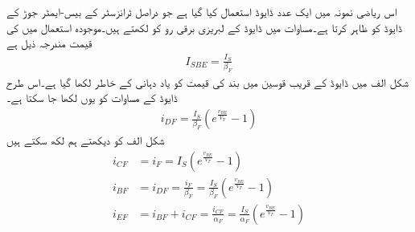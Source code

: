اس ریاضی نمونہ  میں ایک عدد ڈایوڈ استعمال کیا گیا ہے جو دراصل ٹرانزسٹر  کے بیس-ایمٹر  جوڑ کے ڈایوڈ  کو ظاہر کرتا ہے۔مساوات  میں ڈایوڈ کے لبریزی برقی رو کو  لکھتے ہیں۔موجودہ استعمال میں  کی قیمت مندرجہ ذیل ہے
\begin{align}
I_{SBE}=\frac{I_S}{\beta_F}
\end{align}
شکل  الف   میں ڈایوڈ  کے قریب قوسین میں بند   کی قیمت   کو یاد دہانی کے خاطر لکھا گیا ہے۔اس طرح ڈایوڈ   کے مساوات کو یوں لکھا جا سکتا ہے۔
\begin{align}
i_{DF}=\frac{I_S}{\beta_F} \left (e^{\frac{v_{BE}}{V_T}}-1 \right )
\end{align}
شکل  الف   کو دیکھتے ہم لکھ سکتے ہیں 
\begin{align} \label{مساوات_ٹرانزسٹر_مال_برداری_سیدھے_رو}
i_{CF}&=i_F=I_S \left (e^{\frac{v_{BE}}{V_T}}-1 \right )\\
i_{BF}&=i_{DF}=\frac{i_F}{\beta_F}=\frac{I_S}{\beta_F} \left (e^{\frac{v_{BE}}{V_T}}-1 \right )\\
i_{EF}&=i_{BF}+i_{CF}=\frac{i_{CF}}{\alpha_F}=\frac{I_S}{\alpha_F} \left (e^{\frac{v_{BE}}{V_T}}-1 \right )
\end{align}

